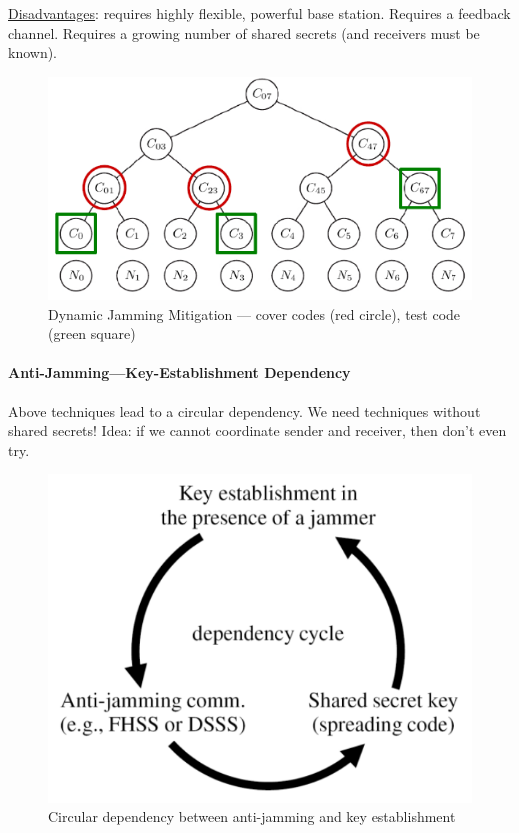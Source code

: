 \underline{Disadvantages}:
requires highly flexible, powerful base station.
Requires a feedback channel.
Requires a growing number of shared secrets (and receivers must be known).

\begin{figure}[h]
	\centering
	\includegraphics[scale=1.4]{images/3-chiang.png}
	\caption{Dynamic Jamming Mitigation --- cover codes (red circle), test code (green square)}%
	\label{fig:chiang}
\end{figure}

\paragraph{Anti-Jamming---Key-Establishment Dependency}
Above techniques lead to a circular dependency.
We need techniques without shared secrets!
Idea: if we cannot coordinate sender and receiver, then don't even try.

\begin{figure}[h]
	\centering
	\includegraphics[scale=0.4]{images/3-jamming-key-cycle.png}
	\caption{Circular dependency between anti-jamming and key establishment}%
	\label{fig:jamming-key-cycle}
\end{figure}

